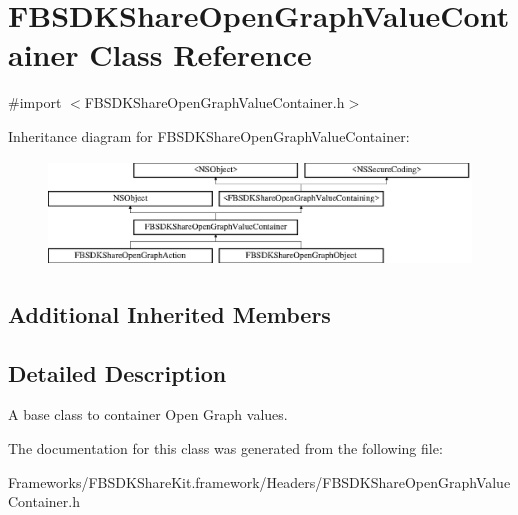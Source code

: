 \hypertarget{interface_f_b_s_d_k_share_open_graph_value_container}{}\section{F\+B\+S\+D\+K\+Share\+Open\+Graph\+Value\+Container Class Reference}
\label{interface_f_b_s_d_k_share_open_graph_value_container}


{\ttfamily \#import $<$F\+B\+S\+D\+K\+Share\+Open\+Graph\+Value\+Container.\+h$>$}

Inheritance diagram for F\+B\+S\+D\+K\+Share\+Open\+Graph\+Value\+Container\+:\begin{figure}[H]
\begin{center}
\leavevmode
\includegraphics[height=2.786070cm]{interface_f_b_s_d_k_share_open_graph_value_container}
\end{center}
\end{figure}
\subsection*{Additional Inherited Members}


\subsection{Detailed Description}
A base class to container Open Graph values. 

The documentation for this class was generated from the following file\+:\begin{DoxyCompactItemize}
\item 
Frameworks/\+F\+B\+S\+D\+K\+Share\+Kit.\+framework/\+Headers/F\+B\+S\+D\+K\+Share\+Open\+Graph\+Value\+Container.\+h\end{DoxyCompactItemize}
